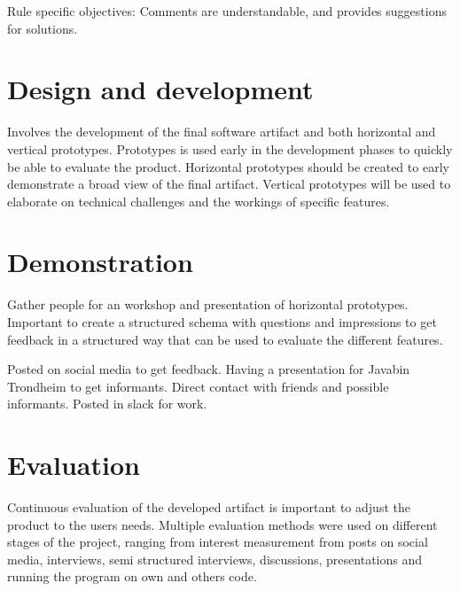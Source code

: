 \documentclass{report}
\begin{document}


Rule specific objectives: 
Comments are understandable, and provides suggestions for solutions.

\section{Design and development}

Involves the development of the final software artifact and both horizontal and vertical prototypes. Prototypes is used early in the development phases to quickly be able to evaluate the product. Horizontal prototypes should be created to early demonstrate a broad view of the final artifact. Vertical prototypes will be used to elaborate on technical challenges and the workings of specific features. 
 
\section{Demonstration}
Gather people for an workshop and presentation of horizontal prototypes. Important to create a structured schema with questions and impressions to get feedback in a structured way that can be used to evaluate the different features.

Posted on social media to get feedback. Having a presentation for Javabin Trondheim to get informants. Direct contact with friends and possible informants. Posted in slack for work.
 
\section{Evaluation}
Continuous evaluation of the developed artifact is important to adjust the product to the users needs. Multiple evaluation methods were used on different stages of the project, ranging from interest measurement from posts on social media, interviews, semi structured interviews, discussions, presentations and running the program on own and others code.
\end{document}
